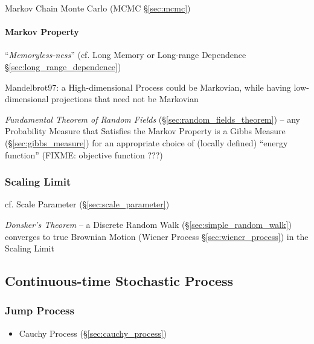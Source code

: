 Markov Chain Monte Carlo (MCMC \S\ref{sec:mcmc})



\paragraph{Markov Property}\label{sec:markov_property}\hfill

``\emph{Memoryless-ness}'' (cf. Long Memory or Long-range Dependence
\S\ref{sec:long_range_dependence})

Mandelbrot97: a High-dimensional Process could be Markovian, while having
low-dimensional projections that need not be Markovian

\emph{Fundamental Theorem of Random Fields} (\S\ref{sec:random_fields_theorem})
-- any Probability Measure that Satisfies the Markov Property is a Gibbs Measure
(\S\ref{sec:gibbs_measure}) for an appropriate choice of (locally defined)
``energy function'' (FIXME: objective function ???)



\subsubsection{Scaling Limit}\label{sec:scaling_limit}

cf. Scale Parameter (\S\ref{sec:scale_parameter})

\emph{Donsker's Theorem} -- a Discrete Random Walk
(\S\ref{sec:simple_random_walk}) converges to true Brownian Motion (Wiener
Process \S\ref{sec:wiener_process}) in the Scaling Limit



\subsection{Continuous-time Stochastic Process}\label{sec:continuous_stochastic}

\subsubsection{Jump Process}\label{sec:jump_process}

\begin{itemize}
  \item Cauchy Process (\S\ref{sec:cauchy_process})
\end{itemize}



